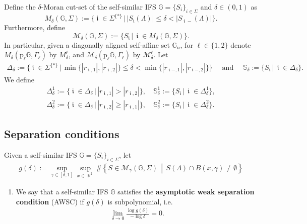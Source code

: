 \documentclass[a4paper, 11pt]{article}
\DeclareMathOperator{\R}{\mathbb{R}}
\DeclareMathOperator{\iii}{\mathfrak{i}}
\numberwithin{equation}{section}
\theoremstyle{plain}
\theoremstyle{remark}
\theoremstyle{definition}
\begin{document}
Define the $\delta$-Moran cut-set of the self-similar IFS $\mathbb{G} = \big\{S_i \big\}_{i \in \Sigma}$ and $\delta \in (0,1)$ as
\[
M_\delta(\mathbb{G}, \Sigma) := \Big\{ \iii\in\Sigma^{\{*\}} \, \Big|\, |S_{\iii}(\Lambda)| \leq \delta < |S_{\iii-}(\Lambda)| \Big\}.
\]
Furthermore, define
\[
\mathcal{M}_\delta(\mathbb{G}, \Sigma) := \Big\{ S_{\iii}\, \Big|\, \iii \in M_\delta(\mathbb{G}, \Sigma)\Big\}.
\]
In particular, given a diagonally aligned self-affine set $\mathbb{G}_n$, for $\ell \in \{1,2\}$ denote $M_\delta(\mathrm{p}_\ell\mathbb{G}, \Gamma_\ell)$ by $M_\delta^\ell$, and $\mathcal{M}_\delta(\mathrm{p}_\ell\mathbb{G}, \Gamma_\ell)$ by $\mathcal{M}_\delta^{\ell}$. Let
\begin{align} \label{eq:Delta}
	\Delta_\delta := \Big\{\iii \in \Sigma^{\{*\}} \, \Big|\, \min\{|r_{\iii,1}|,|r_{\iii,2}|\} \leq \delta < \min\{|r_{\iii-,1}|,|r_{\iii-,2}|\}\Big\} \quad \text{ and } \quad \mathbb{S}_\delta := \big\{S_{\iii}  \, \big|\, \iii \in \Delta_\delta \big\}.
\end{align}
We define
\begin{align*}
\Delta_\delta^1 := \big\{\iii \in \Delta_\delta \, \big|\, |r_{\iii,1}| > |r_{\iii,2}|\big\}, \quad \mathbb{S}_\delta^1 := \big\{S_{\iii}  \, \big|\, \iii \in \Delta_\delta^1 \big\},\\
	\Delta_\delta^2 := \big\{\iii \in \Delta_\delta \, \big|\, |r_{\iii,2}| \geq |r_{\iii,1}|\big\}, \quad \mathbb{S}_\delta^2 := \big\{S_{\iii}  \, \big|\, \iii \in \Delta_\delta^2 \big\} .
\end{align*}




\subsection{Separation conditions}
Given a self-similar IFS $\mathbb{G} = \{S_i\}_{i \in \Sigma}$, let
\begin{align} \label{eq:awscdefqu}
g(\delta) := \sup_{\gamma \in [\delta,1]}\sup_{x \in \R^2}\#\left\{S \in \mathcal{M}_{\gamma}(\mathbb{G}, \Sigma) \, \middle|\, S(\Lambda) \cap B(x,\gamma) \neq \emptyset \right\}
\end{align}

\begin{enumerate}[label = $$, leftmargin=0pt, ref = AWSC]
\item\label{AWSC} We say that a self-similar IFS $\mathbb{G}$ satisfies the \textbf{asymptotic weak separation condition} (AWSC) if $g(\delta)$ is subpolynomial, i.e.
\begin{align*}
\lim_{\delta \to 0}\frac{ \log g(\delta)}{-\log \delta} = 0.
\end{align*}
\end{enumerate}
\end{document}
